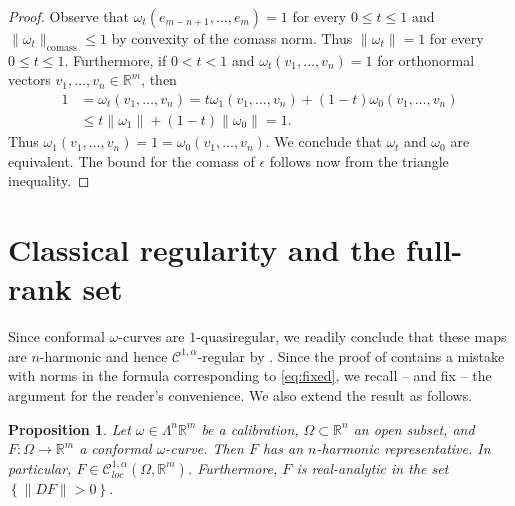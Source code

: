 \documentclass[a4paper,leqno,11pt]{amsart}
\numberwithin{equation}{section}
\newtheorem{proposition}[theorem]{Proposition}
\theoremstyle{remark}
\theoremstyle{remark}
\newcommand{\R}{\mathbb{R}}
\newcommand{\comass}{\mathrm{comass}}
\begin{document}
\begin{proof}
Observe that $\omega_t( e_{m-n+1}, \dots, e_{m} ) = 1$ for every $0 \leq t \leq 1$ and $\| \omega_t \|_{ \comass } \leq 1$ by convexity of the comass norm. Thus $\| \omega_t \| = 1$ for every $0 \leq t \leq 1$. Furthermore, if $0 < t < 1$ and $\omega_t( v_1, \dots, v_n ) = 1$ for orthonormal vectors $v_1, \dots, v_n \in \R^m$, then
\begin{align*}
    1 &= \omega_t( v_1, \dots, v_n ) = t \omega_1( v_1, \dots, v_n ) + (1-t) \omega_0( v_1, \dots, v_n ) 
    \\
    &\leq t \|\omega_1\| + (1-t)\| \omega_0 \| = 1.
\end{align*}
Thus $\omega_1( v_1, \dots, v_n ) = 1 = \omega_0( v_1, \dots, v_n )$. We conclude that $\omega_{t}$ and $\omega_0$ are equivalent. The bound for the comass of $\epsilon$ follows now from the triangle inequality.
\end{proof}





\section{Classical regularity and the full-rank set}
\label{sec:C1}

Since conformal $\omega$-curves are $1$-quasiregular, we readily conclude that these maps are $n$-harmonic and hence $\mathcal{C}^{1,\alpha}$-regular by \cite[Theorem 5.1]{Hei:Pan:Pry:23}. Since the proof of  \cite[Theorem 5.1]{Hei:Pan:Pry:23} contains a mistake with norms in the formula corresponding to \eqref{eq:fixed}, we recall -- and fix -- the argument for the reader's convenience. We also extend the result as follows.

\begin{proposition}\label{prop:nharmonic}
Let $\omega \in \Lambda^n \R^m$ be a calibration, $\Omega \subset \R^n$ an open subset, and $F \colon \Omega \to \R^m$ a conformal $\omega$-curve. Then $F$ has an $n$-harmonic representative. In particular, $F \in \mathcal{C}^{1,\alpha}_{loc}( \Omega, \mathbb{R}^m )$. Furthermore, $F$ is real-analytic in the set $\left\{ \|DF\| > 0 \right\}$.
\end{proposition}
\end{document}
